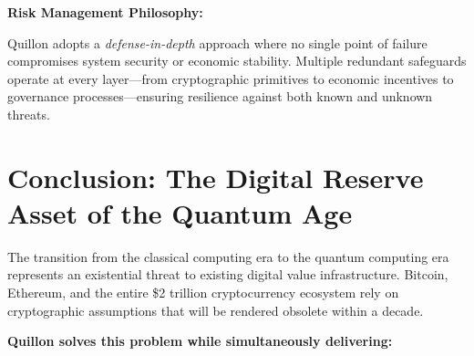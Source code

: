\documentclass[11pt,a4paper]{scrartcl}
\begin{document}
\textbf{Risk Management Philosophy:}

Quillon adopts a \textit{defense-in-depth} approach where no single point of failure compromises system security or economic stability. Multiple redundant safeguards operate at every layer—from cryptographic primitives to economic incentives to governance processes—ensuring resilience against both known and unknown threats.

\newpage

\section{Conclusion: The Digital Reserve Asset of the Quantum Age}

The transition from the classical computing era to the quantum computing era represents an existential threat to existing digital value infrastructure. Bitcoin, Ethereum, and the entire \$2 trillion cryptocurrency ecosystem rely on cryptographic assumptions that will be rendered obsolete within a decade.

\textbf{Quillon solves this problem while simultaneously delivering:}
\end{document}
